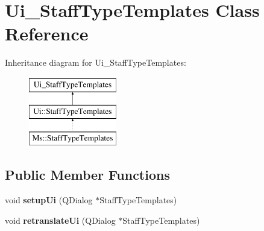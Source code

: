 \hypertarget{class_ui___staff_type_templates}{}\section{Ui\+\_\+\+Staff\+Type\+Templates Class Reference}
\label{class_ui___staff_type_templates}
Inheritance diagram for Ui\+\_\+\+Staff\+Type\+Templates\+:\begin{figure}[H]
\begin{center}
\leavevmode
\includegraphics[height=3.000000cm]{class_ui___staff_type_templates}
\end{center}
\end{figure}
\subsection*{Public Member Functions}
\begin{DoxyCompactItemize}
\item 
\mbox{\label{class_ui___staff_type_templates_a1b112e1780f33823ea4f71f91b697e59}} 
void {\bfseries setup\+Ui} (Q\+Dialog $\ast$Staff\+Type\+Templates)
\item 
\mbox{\label{class_ui___staff_type_templates_a972e63b9f92a1b10e76e35f772408d63}} 
void {\bfseries retranslate\+Ui} (Q\+Dialog $\ast$Staff\+Type\+Templates)
\end{DoxyCompactItemize}
